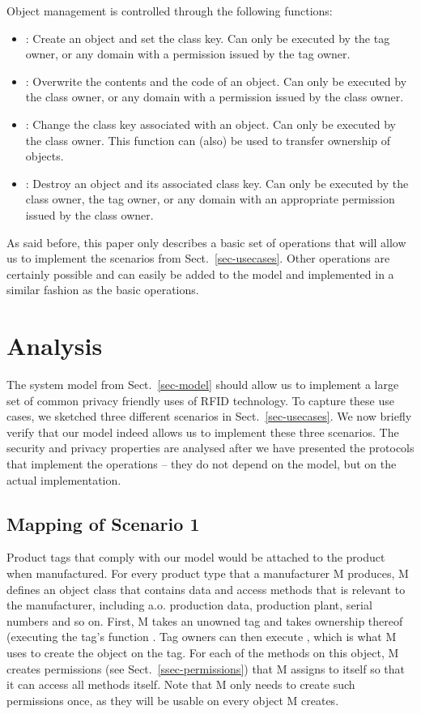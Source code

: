 Object management is controlled through the following functions:
\begin{itemize} 
\fixlistspacing
\item {}: Create an object and set the class key. Can only be executed by the tag owner, or any domain with a permission issued by the tag owner.
\item {}: Overwrite the contents and the code of an object. Can only be executed by the class owner, or any domain with a permission issued by the class owner.
\item {}: Change the class key associated with an object. Can only be executed by the class owner. This function can (also) be used to transfer ownership of objects.
\item {}: Destroy an object and its associated class key. Can only be executed by the class owner, the tag owner, or any domain with an appropriate permission issued by the class owner.
\end{itemize}
As said before, this paper only describes a basic set of operations that will
allow us to implement the scenarios from Sect.~\ref{sec-usecases}.
Other operations are certainly possible and can easily be added to the model
and implemented in a similar fashion as the basic operations.

\section{Analysis}
\label{sec-analysis}

The system model from Sect.~\ref{sec-model} should allow us to implement a
large set of common privacy friendly uses of RFID technology. To capture these
use cases, we sketch\-ed three different scenarios in Sect.~\ref{sec-usecases}.  
We now briefly verify that our model indeed allows us to implement these three
scenarios. The security and privacy properties are analysed after
we have presented the protocols that implement the operations -- they do not
depend on the model, but on the actual implementation.

\subsection{Mapping of Scenario 1}



Product tags that comply with our model would be attached to the product when
manufactured. For every product type that a manufacturer M produces, M defines
an object class  that contains data and access methods that is
relevant to the manufacturer, including a.o. production data, production plant,
serial numbers and so on. First, M takes an unowned tag and takes ownership
thereof (executing the tag's function . 
Tag owners can then execute , which is what M uses to create
the  object on the tag.
For each of the methods on this object, 
M creates permissions (see Sect.~\ref{ssec-permissions}) that M assigns to
itself so that it can access all methods itself.
Note that M only needs to create such permissions once, as they will be
usable on every  object M creates.

